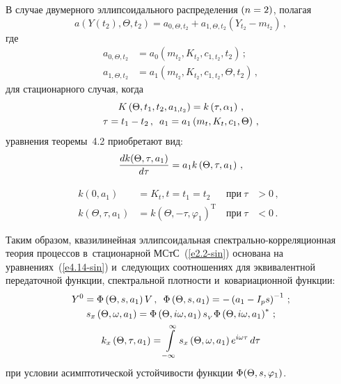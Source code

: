 \begin{multicols}{2}
\smallskip

В случае двумерного эллипсоидального распределения $(n\hm=2)$, полагая
\begin{equation*}
a\left(Y\left(t_2\right),\Theta,t_2\right)=a_{0,\Theta,t_2} +
    a_{1,\Theta,t_2} \left(Y_{t_2} - m_{t_2}\right)\,, %
    \end{equation*}
где
    \begin{align*}
    a_{0,\Theta,t_2}&= a_0 \left(m_{t_2}, K_{t_2}, c_{1,t_2}, t_2\right)\,;\\
    a_{1,\Theta,t_2}&=a_1 \left(m_{t_2}, K_{t_2}, c_{1,t_2}, \Theta,t_2\right)\,,
    \end{align*}
для стационарного случая, когда
    \begin{gather*}
    K\left(\Theta,t_1, t_2,a_{1,t_2}\right) = k \left(\tau, \alpha_1\right)
    \,,\\
     \tau=     t_1-t_2\,,\enskip a_1 = a_1\left(m_t,K_t,c_1,\Theta\right)\,,
     \end{gather*}
уравнения теоремы~4.2 приобретают вид:
\begin{equation*}
\displaystyle\frac{\displaystyle dk(\Theta,\tau,a_1)\mathstrut}{\displaystyle d\tau\mathstrut} =a_1 k\left(\Theta,\tau,a_1\right)\,,
\end{equation*}

\vspace*{-12pt}

\noindent
\begin{alignat*}{2}
  k\left(0,a_1\right)&=K_t, t=t_1=t_2 &\  \mbox{при}\  \tau&>0\,,\ \ \\[3pt]
k\left(\Theta,\tau,a_1\right) &=k\left(\Theta,-\tau,\varphi_1\right)^{\mathrm{T}}&\ 
\mbox{при}\  \tau&<0\,.
\end{alignat*}

Таким образом,  квазилинейная эллипсоидальная
спект\-раль\-но-кор\-ре\-ля\-ци\-он\-ная тео\-рия процессов в~стационарной
МСтС~(\ref{e2.2-sin}) основана на  уравнениях~(\ref{e4.14-sin}) и~следующих
соотношениях для эквивалент\-ной передаточной функции, спектральной
плотности и~ковариационной функции:
\begin{gather*}
Y^0 =\Phi \left(\Theta, s,a_1\right) V\,,\enskip 
\Phi \left(\Theta,s,a_1\right) =-\left(a_1-I_p s\right)^{-1}\,; %
\\
s_x\left(\Theta,\w,a_1\right)=\Phi \left(\Theta,i\w,a_1\right)
s_{_V}\Phi\left(\Theta,i\w,a_1\right)^*\,;\\
k_x\left(\Theta,\tau,a_1\right) =
\int\limits_{-\infty}^\infty s_x \left(\Theta,\w,a_1\right) e^{i\w
    \tau}\, d\tau
    \end{gather*}
при условии асимптотической устойчивости функции
$\Phi(\Theta,s,\varphi_1)$.


\end{multicols}
